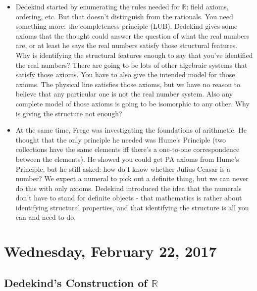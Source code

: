 \documentclass[12pt]{article}
\theoremstyle{definition}
\begin{document}
\begin{itemize}
    \item
        Dedekind started by enumerating the rules needed for $\mathbb{R}$:
        field axioms, ordering, etc. But that doesn't distinguish from the
        rationals. You need something more: the completeness principle (LUB).
        Dedekind gives some axioms that the thought could answer the question
        of what the real numbers are, or at least he says the real numbers
        satisfy those structural features. Why is identifying the structural
        features enough to say that you've identified the real numbers? There
        are going to be lots of other algebraic systems that satisfy those
        axioms. You have to also give the intended model for those axioms. The
        physical line satisfies those axioms, but we have no reason to believe
        that any particular one is not the real number system. Also any
        complete model of those axioms is going to be isomorphic to any other.
        Why is giving the structure not enough?
    \item
        At the same time, Frege was investigating the foundations of
        arithmetic. He thought that the only principle he needed was Hume's
        Principle (two collections have the same elements iff there's a
        one-to-one correspondence between the elements). He showed you could
        get PA axioms from Hume's Principle, but he still asked: how do I know
        whether Julius Ceasar is a number? We expect a numeral to pick out a
        definite thing, but we can never do this with only axioms. Dedekind
        introduced the idea that the numerals don't have to stand for definite
        objects - that mathematics is rather about identifying structural
        properties, and that identifying the structure is all you can and need
        to do. 
\end{itemize}

\section{Wednesday, February 22, 2017}

\subsection{Dedekind's Construction of $\mathbb{R}$}
\end{document}
